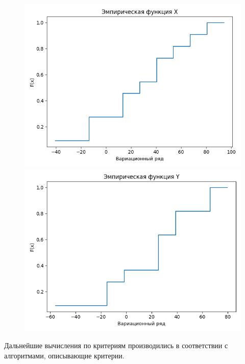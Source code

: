 \begin{figure}[H]
	\begin{minipage}[H]{0.49\linewidth}
		\begin{center}
			\includegraphics[width=\linewidth]{figures/ecdf_X}
		\end{center}
	\end{minipage}
	\hfill
	\begin{minipage}[H]{0.49\linewidth}
		\begin{center}
			\includegraphics[width=\linewidth]{figures/ecdf_Y}
		\end{center}
	\end{minipage}
\end{figure}

Дальнейшие вычисления по критериям производились в соответствии с алгоритмами, описывающие критерии.



